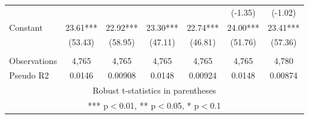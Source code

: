 \documentclass[]{article}
\begin{document}
\begin{tabular}{lcccccc}
 &  &  &  &  & (-1.35) & (-1.02) \\
Constant & 23.61*** & 22.92*** & 23.30*** & 22.74*** & 24.00*** & 23.41*** \\
 & (53.43) & (58.95) & (47.11) & (46.81) & (51.76) & (57.36) \\
 &  &  &  &  &  &  \\
Observations & 4,765 & 4,765 & 4,765 & 4,765 & 4,765 & 4,780 \\
 Pseudo R2 & 0.0146 & 0.00908 & 0.0148 & 0.00924 & 0.0148 & 0.00874 \\ \hline
\multicolumn{7}{c}{ Robust t-statistics in parentheses} \\
\multicolumn{7}{c}{ *** p$<$0.01, ** p$<$0.05, * p$<$0.1} \\
\end{tabular}
\end{document}
